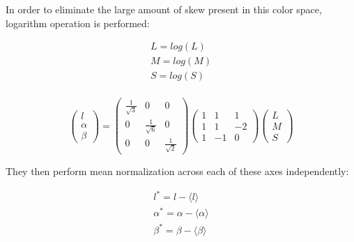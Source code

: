 \documentclass{nitk}
\begin{document}
In order to eliminate the large amount of skew present in this color space, logarithm operation is performed:

\begin{equation}
\begin{array}{l}
L = log(L) \\

    M = log(M) \\

    S = log(S) \\
\end{array}
\end{equation}

\begin{equation}
    \begin{pmatrix} l \\ \alpha \\ \beta \end{pmatrix} = 
    \begin{pmatrix} \frac{1}{\sqrt{3}} & 0 & 0 \\ 0 & \frac{1}{\sqrt{6}} & 0 \\ 0 & 0 & \frac{1}{\sqrt{2}} \end{pmatrix}
    \begin{pmatrix} 1 & 1 & 1 \\ 1 & 1 & -2 \\ 1 & -1 & 0 \end{pmatrix}
    \begin{pmatrix} L \\ M \\ S \end{pmatrix}
\end{equation}

They then perform mean normalization across each of these axes independently:

\begin{equation}
    \begin{array}{l}
         l^{*} = l - \langle l \rangle \\
         \alpha^{*} = \alpha - \langle \alpha \rangle \\
         \beta^{*} = \beta - \langle \beta \rangle \\
    \end{array}
\end{equation}
\end{document}
